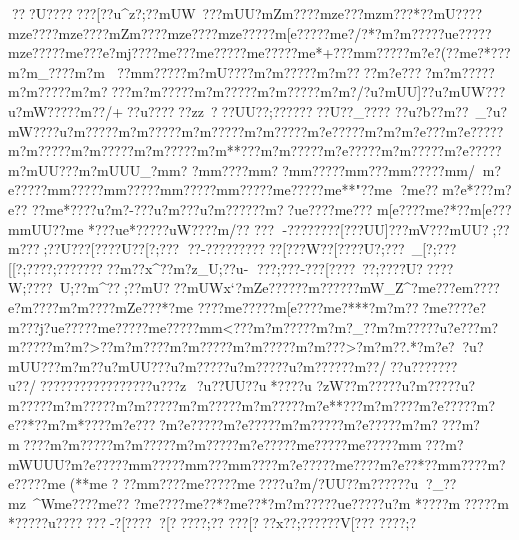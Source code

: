 {{{{{{{{{{{{{{{{{{{{{{{{{{{{{{{{{{{{{{{{{{{{{{{{{{{{{{{{{{{{{{{{{{{{{{{{{{{{{{{{{{{{{{{{{{{{{{{{{{{{{{{{{{{{{{{{{{{{{{{{{{{{{{{{{{{{{{{{{{{{{{{{{{{{{{{{{{{{{{{{{{{{{{{{{{{{{{{{{{{{{{{{{{{{{{{{{{{{{{{{{{{{{{{{{{{{{{{{{{{{{{{{{{{{{{{{{{{{{{{{{{{{{{{{{{{{{{{{{{{{{{{{{{{{{{{{{{{{{{{{{{{{{{{{{{{{{{{{{{{{{{{{{{{{{{{{{{{{{{{{{{{{{{{{{{{{{{{{{{{{{{{{{{{{{{{{{{{{{{{{{{{{{{{{{{{{{{{{{{{{{{{{{{{{{{{{{{{{{{{{{{{{{{{{{{{{{{{{{{{{{{{{{{{{{{{{{{{{{{{{{{{{{{{{{{{{{{{{{{{{{{{{{{{{{{{{{{{{{{{{{{{{{{{{{{{{{{{{{{{{{{{{{{{{{{{{{{{{{{{{{{{{{{{{{{{{{{{{{{{{{{{{{{{{{{{{{{{{{{{{{{{{{{{{{{{{{{{{{{{{{{{{{{{{{{{{{{{{{{{{{{{{{{{{{{{{{{{{{{{{{{{{{{{{{{{{{{{{{{{{{???U???{??}?? [??u^z? ;??mUW~??}?mUU{?mZm????{mze??  ?mzm???*?}?mU????mze????{mze????{mZm????{mze????{mze?????m[e?????m{e?/?*?m?m?????u{e?????mze?????m{e???{e?mj????m{e???m{e?????m{e?????m{e*+???m{m?????m?e?( ??m{e?*???m?m_????m?m
??m{m?????m?mU????m?m?????m?m????m?e????m?m?????m?m?????m?m????m?m?????m?m?????m?m?????m?m?/ ?u?mUU]??u?mUW???u?mW????}?m??/+??u??????}zz~???}UU??;??}??????}U??_?}?}\VWU?}?}    ?}?u  ?b?}?m??~_?u?mW????u?m?????m?m?????m?m?????m?m?????m?e?????m?m    ?m?e???m?e?????m?m?????m?m?????m?m?????m?m**???m?m?????m?e?????m?m?????m?e?????m?mUU???m?mUUU_?m{m?   ?m{m??? ?m{m? ?m{m?????m{m???m{m?????m{m/ {m?e?????m{m?????m{m?????m{m?????m{m?????m{e?????m{e**"??m{e  ?{m{e ??{m?e*???{m?e??
??m{e*????u?m?-???u?m???u?m?????}?m??u{e????{m{e???
{m[e????{m{e?*??{m[e???m{mUU??{m{e
*???u{e*????}?uW}???}?m/??
???}
-????}????[???UU]{???mV\X??}?mUU?;??m???;??}U???[????U??[?;???
?{?-???????????[? ??W??[????U{?;???~_[?;? ??[[?;????;?????????m??x^?}?m?z_U;??u-	???;???-???[????~??;????U{?????W;??}??~U;??m^??;??mU? ??mUWx`?mZe??????m?????}?mW_Z^?m{e???e{m????{e?m????{m?m ????mZe???*?m{e
????m{e?????m[e??? ?m{e?***?m?m?? ?m{e????{e?m???j?u{e?????m{e?????m{e?????m{m<?? ?m?m?????m?m?_??m?m?????u?e???m?m?????m?m?>??m?m????m?m?????m?m?????m?m???>?m?m??.*?m?e? ?u?mUU???m?m   ??u?mUU???u?m?????u?m?????u?m?????}?m??/?}?u???????u??/???}???????}???????u???z~?u??UU?}?u*???}?u ?zW?}?m?????u?m?????u?m?????m?m?????m?m?????m?m?????m?m?????m?e**???m?m????m?e?????m?e??*??m?m*????m?e????m?e?????m?e?????m?m?????m?e?????m?m????m?m????m?m?????m?m?????m?m?????m?e?????m{e?????m{e?????m{m?? ?m?mWUUU?m?e?????m{m?????m{m???m{m????{m?e?????m{e????{m?e??*??m{m????{m?e?????m{e (**{m{e ?
??m{m????{m{e?????m{e????u?m/?UU?}?m?????}?u?_?}?mz~^W{m{e????{m{e??
?{m{e????{m{e??*?{m{e??*?{m?m?????u{e?????u?m *???}?m??}???m
*?????u??????}?-?[?????[?????;??} ???[???x??;??????V[???
???{?;?
}}}}}}}}}}}}}}}}}}}}}}}}}}}}}}}}}}}}}}}}}}}}}}}}}}}}}}}}}}}}}}}}}}}}}}}}}}}}}}}}}}}}}}}}}}}}}}}}}}}}}}}}}}}}}}}}}}}}}}}}}}}}}}}}}}}}}}}}}}}}}}}}}}}}}}}}}}}}}}}}}}}}}}}}}}}}}}}}}}}}}}}}}}}}}}}}}}}}}}}}}}}}}}}}}}}}}}}}}}}}}}}}}}}}}}}}}}}}}}}}}}}}}}}}}}}}}}}}}}}}}}}}}}}}}}}}}}}}}}}}}}}}}}}}}}}}}}}}}}}}}}}}}}}}}}}}}}}}}}}}}}}}}}}}}}}}}}}}}}}}}}}}}}}}}}}}}}}}}}}}}}}}}}}}}}}}}}}}}}}}}}}}}}}}}}}}}}}}}}}}}}}}}}}}}}}}}}}}}}}}}}}}}}}}}}}}}}}}}}}}}}}}}}}}}}}}}}}}}}}}}}}}}}}}}}}}}}}}}}}}}}}}}}}}}}}}}}}}}}}}}}}}}}}}}}}}}}}}}}}}}}}}}}}}}}}}}}}}}}}}}}}}}}}}}}}}}}}}}}}}}}}}}}}}}}}}}}}}}}}}}}}}}}}}}}}}}}}}}}}}}}}}}}}}}}}}}}}}}}}}}}}}}}}}}}}}}}}}}}}}}}}}}}}}}}}}}}}}}}}}}}}}}}}}}}}}}}}}}}}}}}}}}}}}}}}}}}}}}}}
